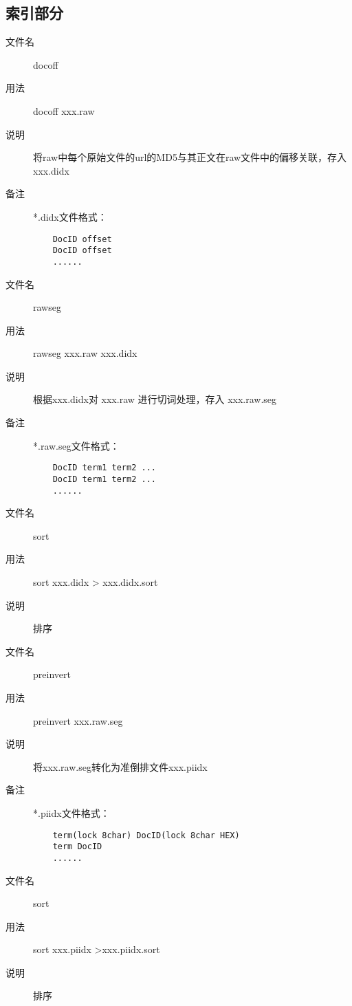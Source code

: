 \documentclass[14pt,a4paper]{article}
\begin{document}
\subsection{索引部分}
\begin{description}
\item[文件名] docoff
\item[用法] docoff xxx.raw
\item[说明] 将raw中每个原始文件的url的MD5与其正文在raw文件中的偏移关联，存入xxx.didx
\item[备注] *.didx文件格式：\\
  \begin{lstlisting}
    DocID offset
    DocID offset
    ......
  \end{lstlisting}
\end{description}
\begin{description}
\item[文件名] rawseg
\item[用法] rawseg xxx.raw xxx.didx
\item[说明] 根据xxx.didx对 xxx.raw 进行切词处理，存入 xxx.raw.seg
\item[备注] *.raw.seg文件格式：\\
  \begin{lstlisting}
    DocID term1 term2 ...
    DocID term1 term2 ...
    ......
  \end{lstlisting}
\end{description}
\begin{description}
\item[文件名] sort
\item[用法] sort xxx.didx > xxx.didx.sort
\item[说明] 排序
\end{description}
\begin{description}
\item[文件名] preinvert
\item[用法] preinvert xxx.raw.seg
\item[说明] 将xxx.raw.seg转化为准倒排文件xxx.piidx
\item[备注] *.piidx文件格式：\\
  \begin{lstlisting}
    term(lock 8char) DocID(lock 8char HEX)
    term DocID
    ......
  \end{lstlisting}
\end{description}
\begin{description}
\item[文件名] sort
\item[用法] sort xxx.piidx >xxx.piidx.sort
\item[说明] 排序
\end{description}
\end{document}
